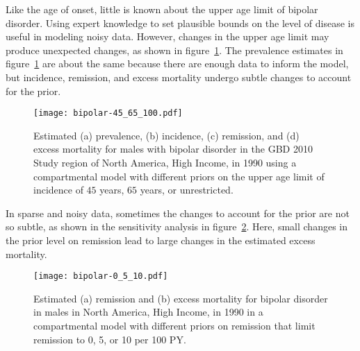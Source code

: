 Like the age of onset, little is known about the upper age limit of
bipolar disorder.  Using expert knowledge to set plausible bounds on the
level of disease is useful in modeling noisy data.  However, changes in the upper age
limit may produce unexpected changes, as shown in figure~\ref{fig:app-bipolar onset}.
The prevalence estimates in figure~\ref{fig:app-bipolar onset} are about
the same because there are enough data to inform the model, but incidence,
remission, and excess mortality undergo subtle changes to account for the prior.

    \begin{figure}[h]
        \begin{center}
            \texttt{[image: bipolar-45\_65\_100.pdf]}
            \caption[Comparison of estimates for bipolar disorder using 
              a compartmental model with different priors on the upper
              age limit of incidence.]{Estimated (a) prevalence, (b) 
              incidence, (c) remission, and
              (d) excess mortality for males with bipolar
              disorder in the GBD 2010 Study region of North America, High Income,
              in 1990 using a compartmental model with
              different priors on the upper age limit of
              incidence of $45$ years, $65$ years, or unrestricted.}
            \label{fig:app-bipolar onset}
        \end{center}
    \end{figure}

In sparse and noisy data, sometimes the changes to account for the prior
are not so subtle, as shown in the sensitivity analysis in
figure~\ref{fig:app-bipolar remission}.  Here, small changes in the
prior level on remission lead to large changes in the estimated excess mortality.

    \begin{figure}[h]
        \begin{center}
            \texttt{[image: bipolar-0\_5\_10.pdf]}
            \caption[Comparison of estimates for bipolar disorder using a 
              compartmental model with different priors on remission.]{Estimated 
              (a) remission and (b) excess
              mortality for bipolar disorder in
              males in North America, High Income,
              in 1990 in a compartmental model
              with different priors on remission that limit remission
              to 0, 5, or 10 per 100 PY.}
            \label{fig:app-bipolar remission}
        \end{center}
    \end{figure}


